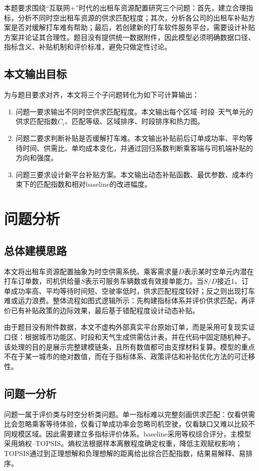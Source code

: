 \documentclass[12pt,a4paper]{ctexart}
\begin{document}
本题要求围绕“互联网+”时代的出租车资源配置研究三个问题：首先，建立合理指标，分析不同时空出租车资源的供求匹配程度；其次，分析各公司的出租车补贴方案是否对缓解打车难有帮助；最后，若创建新的打车软件服务平台，需要设计补贴方案并论证其合理性。题目没有提供统一数据附件，因此模型必须明确数据口径、指标含义、补贴机制和评价标准，避免只做定性讨论。

\subsection{本文输出目标}
为与题目要求对齐，本文将三个子问题转化为如下可计算输出：
\begin{enumerate}[label=(\arabic*)]
  \item 问题一要求输出不同时空供求匹配程度。本文输出每个区域--时段--天气单元的供求匹配指数$C_i$、匹配等级、区域排序、时段排序和热力图。
  \item 问题二要求判断补贴是否缓解打车难。本文输出补贴前后订单成功率、平均等待时间、供需比、单均成本变化，并通过回归系数判断乘客端与司机端补贴的方向和强度。
  \item 问题三要求设计新平台补贴方案。本文输出动态补贴函数、最优参数、成本约束下的匹配指数和相对baseline的改进幅度。
\end{enumerate}

\section{问题分析}
\subsection{总体建模思路}
本文将出租车资源配置抽象为时空供需系统。乘客需求量$D$表示某时空单元内潜在打车订单数，司机供给量$S$表示可服务车辆数或有效接单能力。当$S/D$接近1、订单成功率高、平均等待时间短、空驶率低时，供求匹配程度较好；反之则出现打车难或运力浪费。整体流程如图式逻辑所示：先构建指标体系并评价供求匹配，再评价已有补贴政策的边际效果，最后基于错配程度设计动态补贴。

由于题目没有附件数据，本文不虚构外部真实平台原始订单，而是采用可复现实证口径：根据城市功能区、时段和天气生成供需估计表，并在代码中固定随机种子。该处理的目的是展示完整建模链条，且所有数值都可由支撑材料复算。模型的重点不在于某一城市的绝对数值，而在于指标体系、政策评估和补贴优化方法的可迁移性。

\subsection{问题一分析}
问题一属于评价类与时空分析类问题。单一指标难以完整刻画供求匹配：仅看供需比会忽略乘客等待体验，仅看订单成功率会忽略司机空驶，仅看缺口又难以比较不同规模区域。因此需要建立多指标评价体系。baseline采用等权综合评分，主模型采用熵权--TOPSIS。熵权法根据样本离散程度确定权重，降低主观赋权影响；TOPSIS通过到正理想解和负理想解的距离给出综合匹配指数，结果易解释、易排序。
\end{document}
